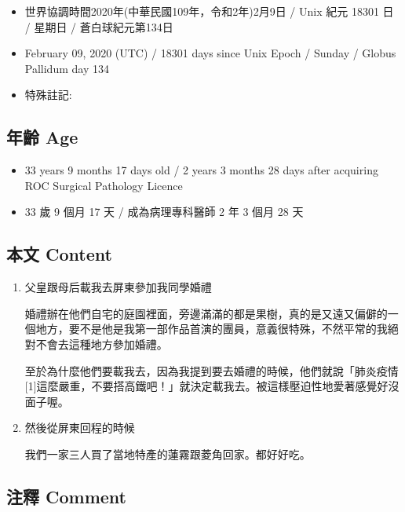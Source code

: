 \documentclass[a5paper, 12pt
]{book}
\providecommand{\tightlist}{%
  \setlength{\itemsep}{0pt}\setlength{\parskip}{0pt}}
\begin{document}
\begin{itemize}
\tightlist
\item
  世界協調時間2020年(中華民國109年，令和2年)2月9日 / Unix 紀元 18301 日
  / 星期日 / 蒼白球紀元第134日
\item
  February 09, 2020 (UTC) / 18301 days since Unix Epoch / Sunday /
  Globus Pallidum day 134
\item
  特殊註記:
\end{itemize}

\hypertarget{ux5e74ux9f61-age-70}{%
\subsection{年齡 Age}\label{ux5e74ux9f61-age-70}}

\begin{itemize}
\tightlist
\item
  33 years 9 months 17 days old / 2 years 3 months 28 days after
  acquiring ROC Surgical Pathology Licence
\item
  33 歲 9 個月 17 天 / 成為病理專科醫師 2 年 3 個月 28 天
\end{itemize}

\hypertarget{ux672cux6587-content-70}{%
\subsection{本文 Content}\label{ux672cux6587-content-70}}

\begin{enumerate}
\def\labelenumi{\arabic{enumi}.}
\item
  父皇跟母后載我去屏東參加我同學婚禮

  婚禮辦在他們自宅的庭園裡面，旁邊滿滿的都是果樹，真的是又遠又偏僻的一個地方，要不是他是我第一部作品首演的團員，意義很特殊，不然平常的我絕對不會去這種地方參加婚禮。

  至於為什麼他們要載我去，因為我提到要去婚禮的時候，他們就說「肺炎疫情{[}1{]}這麼嚴重，不要搭高鐵吧！」就決定載我去。被這樣壓迫性地愛著感覺好沒面子喔。
\item
  然後從屏東回程的時候

  我們一家三人買了當地特產的蓮霧跟菱角回家。都好好吃。
\end{enumerate}

\hypertarget{ux6ce8ux91cb-comment-69}{%
\subsection{注釋 Comment}\label{ux6ce8ux91cb-comment-69}}
\end{document}
